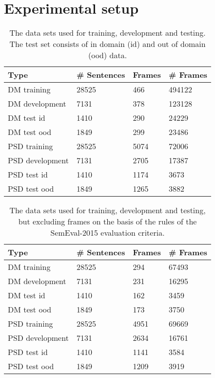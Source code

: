 \section{Experimental setup}
\label{setup}

\begin{table}
    \centering
    \smaller[0.2]
    \begin{tabular}{@{}llll@{}}
        \toprule
        \textbf{Type} & \textbf{\# Sentences} & \textbf{Frames} & \textbf{\# Frames} \\
        \midrule
        DM training & 28525 & 466 & 494122 \\
        DM development & 7131 & 378 & 123128 \\
        DM test id & 1410 & 290 & 24229 \\
        DM test ood & 1849 & 299 & 23486 \\
        \midrule
        PSD training & 28525 & 5074 & 72006 \\
        PSD development & 7131 & 2705 & 17387 \\
        PSD test id & 1410 & 1174 & 3673 \\
        PSD test ood & 1849 & 1265 & 3882 \\
        \bottomrule
    \end{tabular}
    \caption{The data sets used for training, development and testing. The test set consists of in domain (id) and out of domain (ood) data.}
    \label{table:split}
\end{table}

\begin{table}
    \centering
    \smaller[0.2]
    \begin{tabular}{@{}llll@{}}
        \toprule
        \textbf{Type} & \textbf{\# Sentences} & \textbf{Frames} & \textbf{\# Frames} \\
        \midrule
        DM training & 28525 & 294 & 67493 \\
        DM development & 7131 & 231 & 16295 \\
        DM test id & 1410 & 162 & 3459 \\
        DM test ood & 1849 & 173 & 3750 \\
        \midrule
        PSD training & 28525 & 4951 & 69669 \\
        PSD development & 7131 & 2634 & 16761 \\
        PSD test id & 1410 & 1141 & 3584 \\
        PSD test ood & 1849  & 1209 & 3919 \\
        \bottomrule
    \end{tabular}
    \caption{The data sets used for training, development and testing, but excluding frames on the basis of the rules of the SemEval-2015 evaluation criteria.}
    \label{table:split:VandPred}
\end{table}


